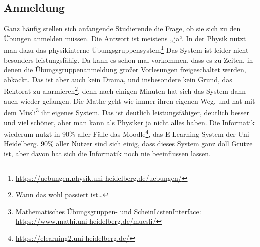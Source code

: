 \subsection{Anmeldung}
Ganz häufig stellen sich anfangende Studierende die Frage, ob sie sich zu den Übungen anmelden müssen. Die Antwort ist meistens „ja“. In der Physik nutzt man dazu das physikinterne Übungsgruppensystem\footnote{\url{https://uebungen.physik.uni-heidelberg.de/uebungen/}} Das System ist leider nicht besonders leistungsfähig. Da kann es schon mal vorkommen, dass es zu Zeiten, in denen die Übungsgruppenanmeldung großer Vorlesungen freigeschaltet werden, abkackt. Das ist aber auch kein Drama, und insbesondere kein Grund, das Rektorat zu alarmieren\footnote{Wann das wohl passiert ist…}, denn nach einigen Minuten hat sich das System dann auch wieder gefangen. Die Mathe geht wie immer ihren eigenen Weg, und hat mit dem Müsli\footnote{Mathematisches Übungsgruppen- und ScheinListenInterface:\\ \url{https://www.mathi.uni-heidelberg.de/muesli/}} ihr eigenes System. Das ist deutlich leistungsfähiger, deutlich besser und viel schöner, aber man kann als Physiker ja nicht alles haben. Die Informatik wiederum nutzt in 90\% aller Fälle das Moodle\footnote{\url{https://elearning2.uni-heidelberg.de/}}, das E-Learning-System der Uni Heidelberg. 90\% aller Nutzer sind sich einig, dass dieses System ganz doll Grütze ist, aber davon hat sich die Informatik noch nie beeinflussen lassen.

